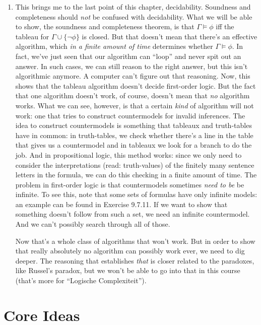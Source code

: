 \begin{enumerate}[\thesection.1]
	\item This brings me to the last point of this chapter, decidability. Soundness and completeness should \emph{not} be confused with decidability. What we will be able to show, the soundness and completeness theorem, is that $\Gamma\vDash\phi$ iff the tableau for $\Gamma\cup\{\neg\phi\}$ is closed. But that doesn't mean that there's an effective algorithm, which \emph{in a finite amount of time} determines whether $\Gamma\vDash\phi$. In fact, we've just seen that our algorithm can ``loop'' and never spit out an answer. In such cases, we can still reason to the right answer, but this isn't algorithmic anymore. A computer can't figure out that reasoning. Now, this shows that the tableau algorithm doesn't decide first-order logic. But the fact that one algorithm doesn't work, of course, doesn't mean that \emph{no} algorithm works. What we can see, however, is that a certain \emph{kind} of algorithm will not work: one that tries to construct countermodels for invalid inferences. The idea to construct countermodels is something that tableaux and truth-tables have in common: in truth-tables, we check whether there's a line in the table that gives us a countermodel and in tableaux we look for a branch to do the job. And in propositional logic, this method works: since we only need to consider the interpretations (read: truth-values) of the finitely many  sentence letters in the formula, we can do this checking in a finite amount of time. The problem in first-order logic is that countermodels sometimes \emph{need to be} be infinite. To see this, note that some sets of formulas have only infinite models: an example can be found in Exercise 9.7.11. If we want to show that something doesn't follow from such a set, we need an infinite countermodel. And we can't possibly search through all of those. 
	
	Now that's a whole class of algorithms that won't work. But in order to show that really absolutely no algorithm can possibly work ever, we need to dig deeper. The reasoning that establishes \emph{that} is closer related to the paradoxes, like Russel's paradox, but we won't be able to go into that in this course (that's more for ``Logische Complexiteit'').
		
	\end{enumerate}

\section{Core Ideas}

